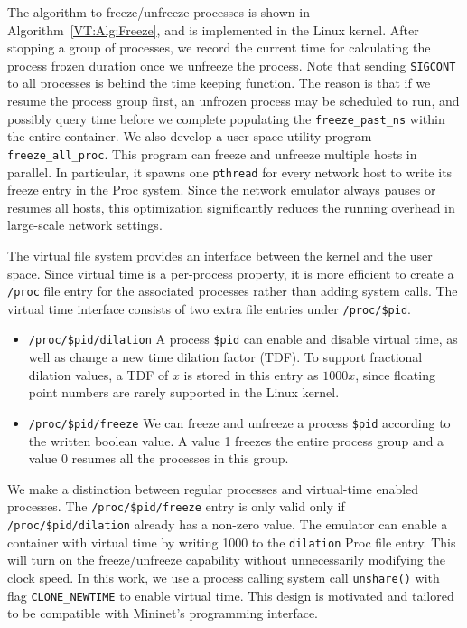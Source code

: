 The algorithm to freeze/unfreeze processes is shown in Algorithm~\ref{VT:Alg:Freeze},
and is implemented in the Linux kernel.
After stopping a group of processes, we record the  current time for calculating the process frozen duration once we unfreeze the process.
Note that sending \texttt{SIGCONT} to all processes is behind the time keeping function.
The reason is that if we resume the process group first, an unfrozen process may be scheduled to run,
and possibly query time before we complete populating the \texttt{freeze\_past\_ns} within the entire container.
We also develop a user space utility program \texttt{freeze\_all\_proc}.
This program can freeze and unfreeze multiple hosts in parallel.
In particular, it spawns one \texttt{pthread} for every network host to write its freeze entry in the Proc system.
Since the network emulator always pauses or resumes all hosts, this optimization significantly reduces the running overhead in large-scale network settings.

The virtual file system provides an interface between the kernel and the user space.
Since virtual time is a per-process property, it is more efficient to create a \texttt{/proc}
file entry for the associated processes rather than adding system calls.
The virtual time interface consists of two extra file entries under \texttt{/proc/\$pid}.
\begin{itemize}
    \item \texttt{/proc/\$pid/dilation} A process \texttt{\$pid} can enable and disable virtual time, as well as change a new time dilation factor (TDF).
        To support fractional dilation values, a TDF of $x$ is stored in this entry as $1000x$,  since floating point numbers are rarely supported in the Linux kernel.
    \item \texttt{/proc/\$pid/freeze} We can freeze and unfreeze a process \texttt{\$pid} according to the written boolean value.
        A value 1 freezes the entire process group and a value 0 resumes all the processes in this group.
\end{itemize}

We make a distinction between regular processes and virtual-time enabled processes.
The \texttt{/proc/\$pid/freeze} entry is only valid only if \texttt{/proc/\$pid/dilation} already has a non-zero value.
The emulator can enable a container with virtual time by writing 1000 to the \texttt{dilation} Proc file entry.
This will turn on the freeze/unfreeze capability without unnecessarily modifying the clock speed.
In this work, we use a process calling system call \texttt{unshare()} with flag \texttt{CLONE\_NEWTIME} to enable virtual time.
This design is motivated and tailored to be compatible with Mininet's programming interface.


